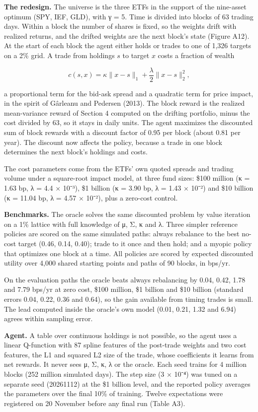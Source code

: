 \documentclass[
  11pt]{article}
\begin{document}
\textbf{The redesign.} The universe is the three ETFs in the support of
the nine-asset optimum (SPY, IEF, GLD), with γ = 5. Time is divided into
blocks of 63 trading days. Within a block the number of shares is fixed,
so the weights drift with realized returns, and the drifted weights are
the next block's state (Figure A12). At the start of each block the
agent either holds or trades to one of 1,326 targets on a 2\% grid. A
trade from holdings \(s\) to target \(x\) costs a fraction of wealth

\[c(s, x) = \kappa \lVert x - s \rVert_1 + \frac{\lambda}{2} \lVert x - s \rVert_2^2 ,\]

a proportional term for the bid-ask spread and a quadratic term for
price impact, in the spirit of Gârleanu and Pedersen (2013). The block
reward is the realized mean-variance reward of Section 4 computed on the
drifting portfolio, minus the cost divided by 63, so it stays in daily
units. The agent maximizes the discounted sum of block rewards with a
discount factor of 0.95 per block (about 0.81 per year). The discount
now affects the policy, because a trade in one block determines the next
block's holdings and costs.

The cost parameters come from the ETFs' own quoted spreads and trading
volume under a square-root impact model, at three fund sizes: \$100
million (κ = 1.63 bp, λ = 4.4 × 10⁻³), \$1 billion (κ = 3.90 bp, λ =
1.43 × 10⁻²) and \$10 billion (κ = 11.04 bp, λ = 4.57 × 10⁻²), plus a
zero-cost control.

\textbf{Benchmarks.} The oracle solves the same discounted problem by
value iteration on a 1\% lattice with full knowledge of μ, Σ, κ and λ.
Three simpler reference policies are scored on the same simulated paths:
always rebalance to the best no-cost target (0.46, 0.14, 0.40); trade to
it once and then hold; and a myopic policy that optimizes one block at a
time. All policies are scored by expected discounted utility over 4,000
shared starting points and paths of 90 blocks, in bps/yr.

On the evaluation paths the oracle beats always rebalancing by 0.04,
0.42, 1.78 and 7.79 bps/yr at zero cost, \$100 million, \$1 billion and
\$10 billion (standard errors 0.04, 0.22, 0.36 and 0.64), so the gain
available from timing trades is small. The lead computed inside the
oracle's own model (0.01, 0.21, 1.32 and 6.94) agrees within sampling
error.

\textbf{Agent.} A table over continuous holdings is not possible, so the
agent uses a linear Q-function with 87 spline features of the post-trade
weights and two cost features, the L1 and squared L2 size of the trade,
whose coefficients it learns from net rewards. It never sees μ, Σ, κ, λ
or the oracle. Each seed trains for 4 million blocks (252 million
simulated days). The step size (3 × 10⁻⁴) was tuned on a separate seed
(20261112) at the \$1 billion level, and the reported policy averages
the parameters over the final 10\% of training. Twelve expectations were
registered on 20 November before any final run (Table A3).
\end{document}
